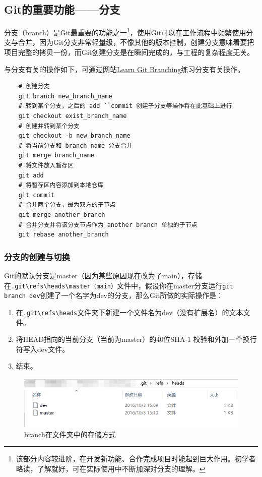 \subsection{Git的重要功能——分支}
分支（branch）是Git最重要的功能之一\footnote{该部分内容较进阶，在开发新功能、合作完成项目时能起到巨大作用。初学者略读，了解就好，可在实际使用中不断加深对分支的理解。}，使用Git可以在工作流程中频繁使用分支与合并，因为Git分支非常轻量级，不像其他的版本控制，创建分支意味着要把项目完整的拷贝一份，而Git创建分支是在瞬间完成的，与工程的复杂程度无关。

与分支有关的操作如下，可通过网站\href{https://learngitbranching.js.org/?locale=zh_CN}{Learn Git Branching}练习分支有关操作。
\begin{lstlisting}
    # 创建分支
    git branch new_branch_name 
    # 转到某个分支，之后的 add ``commit 创建子分支等操作将在此基础上进行
    git checkout exist_branch_name 
    # 创建并转到某个分支
    git checkout -b new_branch_name 
    # 将当前分支和 branch_name 分支合并
    git merge branch_name 
    # 将文件放入暂存区
    git add 
    # 将暂存区内容添加到本地仓库
    git commit 
    # 合并两个分支，最为双方的子节点
    git merge another_branch 
    # 合并分支并将该分支节点作为 another branch 单独的子节点
    git rebase another_branch 
\end{lstlisting}

\subsubsection{分支的创建与切换}
Git的默认分支是master（因为某些原因现在改为了main），存储在\lstinline{.git\refs\heads\master（main）}文件中，假设你在master分支运行\lstinline{git branch dev}创建了一个名字为dev的分支，那么Git所做的实际操作是：

\begin{enumerate}
    \item 在\lstinline{.git\refs\heads}文件夹下新建一个文件名为dev（没有扩展名）的文本文件。
    \item 将HEAD指向的当前分支（当前为master）的40位SHA-1 校验和外加一个换行符写入dev文件。
    \item 结束。
\end{enumerate}

\begin{figure}[ht]
    \centering
    \includegraphics[width=13cm]{image/git/git-branch.png}
    \caption{branch在文件夹中的存储方式}
    \label{git-branch}
\end{figure}

